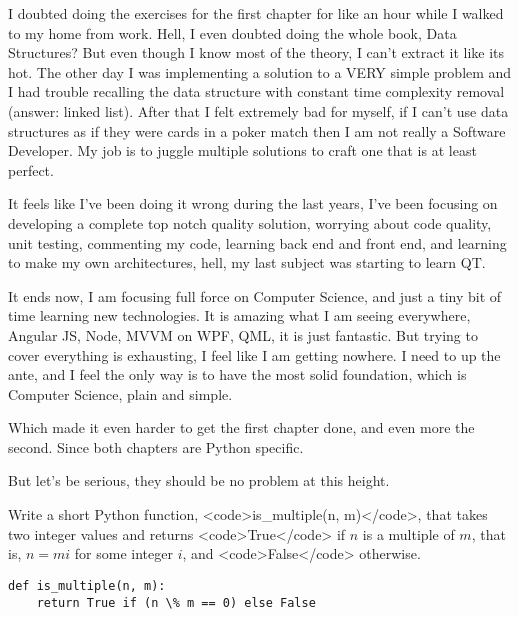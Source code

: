 \label{sec:Exercises}

I doubted doing the exercises for the first chapter for like an hour while I walked to my home from work. Hell, I even doubted doing the whole book, Data Structures? But even though I know most of the theory, I can't extract it like its hot. The other day I was implementing a solution to a VERY simple problem and I had trouble recalling the data structure with constant time complexity removal (answer: linked list). After that I felt extremely bad for myself, if I can't use data structures as if they were cards in a poker match then I am not really a Software Developer. My job is to juggle multiple solutions to craft one that is at least perfect.

 \label{subsec:reshaping}

It feels like I've been doing it wrong during the last years, I've been focusing on developing a complete top notch quality solution, worrying about code quality, unit testing, commenting my code, learning back end and front end, and learning to make my own architectures, hell, my last subject was starting to learn QT.

It ends now, I am focusing full force on Computer Science, and just a tiny bit of time learning new technologies. It is amazing what I am seeing everywhere, Angular JS, Node, MVVM on WPF, QML, it is just fantastic. But trying to cover everything is exhausting, I feel like I am getting nowhere. I need to up the ante, and I feel the only way is to have the most solid foundation, which is Computer Science, plain and simple.

Which made it even harder to get the first chapter done, and even more the second. Since both chapters are Python specific. 

But let's be serious, they should be no problem at this height. 

 \label{subsubsec:ex1_1}

Write a short Python function, <code>is_multiple(n, m)</code>, that takes two integer values and returns <code>True</code> if $n$ is a multiple of $m$, that is, $n = mi$ for some integer $i$, and <code>False</code> otherwise.

\lstset{language=Python}
\begin{lstlisting}[label=ex1.1,caption=Exercise R-1.1]
def is_multiple(n, m):
    return True if (n \% m == 0) else False
\end{lstlisting}